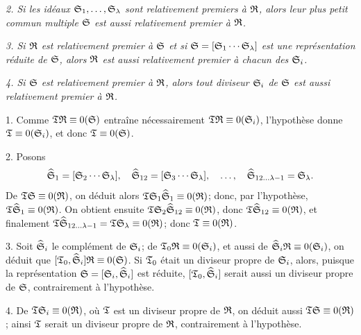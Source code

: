 \emph{2. Si les idéaux $\mathfrak{S}_1,\ldots,\mathfrak{S}_\lambda$ sont relativement premiers à $\mathfrak{R}$, alors leur plus petit commun multiple $\mathfrak{S}$ est aussi relativement premier à $\mathfrak{R}$.}

\emph{3. Si $\mathfrak{R}$ est relativement premier à $\mathfrak{S}$ et si $\mathfrak{S}=[\mathfrak{S}_1\cdots\mathfrak{S}_\lambda]$ est une représentation réduite de $\mathfrak{S}$, alors $\mathfrak{R}$ est aussi relativement premier à chacun des $\mathfrak{S}_i$.}

\emph{4. Si $\mathfrak{S}$ est relativement premier à $\mathfrak{R}$, alors tout diviseur $\mathfrak{S}_i$ de $\mathfrak{S}$ est aussi relativement premier à $\mathfrak{R}$.}

1. Comme $\mathfrak{T}\mathfrak{R}\equiv0(\mathfrak{S})$ entraîne nécessairement $\mathfrak{T}\mathfrak{R}\equiv0(\mathfrak{S}_i)$, l'hypothèse donne $\mathfrak{T}\equiv0(\mathfrak{S}_i)$, et donc $\mathfrak{T}\equiv0(\mathfrak{S})$.

2. Posons
\[
 \widehat{\mathfrak{S}}_1=[\mathfrak{S}_2\cdots\mathfrak{S}_\lambda],\quad
 \widehat{\mathfrak{S}}_{12}=[\mathfrak{S}_3\cdots\mathfrak{S}_\lambda],\quad \ldots,\quad
 \widehat{\mathfrak{S}}_{12\ldots\lambda-1}=\mathfrak{S}_\lambda.
\]
De $\mathfrak{T}\mathfrak{S}\equiv0(\mathfrak{R})$, on déduit alors $\mathfrak{T}\mathfrak{S}_1\widehat{\mathfrak{S}}_1\equiv0(\mathfrak{R})$; donc, par l'hypothèse, $\mathfrak{T}\widehat{\mathfrak{S}}_1\equiv0(\mathfrak{R})$. On obtient ensuite $\mathfrak{T}\mathfrak{S}_2\widehat{\mathfrak{S}}_{12}\equiv0(\mathfrak{R})$, donc $\mathfrak{T}\widehat{\mathfrak{S}}_{12}\equiv0(\mathfrak{R})$, et finalement $\mathfrak{T}\widehat{\mathfrak{S}}_{12\ldots\lambda-1}=\mathfrak{T}\mathfrak{S}_\lambda\equiv0(\mathfrak{R})$; donc $\mathfrak{T}\equiv0(\mathfrak{R})$.

3. Soit $\widehat{\mathfrak{S}}_i$ le complément de $\mathfrak{S}_i$; de $\mathfrak{T}_0\mathfrak{R}\equiv0(\mathfrak{S}_i)$, et aussi de $\widehat{\mathfrak{S}}_i\mathfrak{R}\equiv0(\mathfrak{S}_i)$, on déduit que $[\mathfrak{T}_0,\widehat{\mathfrak{S}}_i]\mathfrak{R}\equiv0(\mathfrak{S})$. Si $\mathfrak{T}_0$ était un diviseur propre de $\mathfrak{S}_i$, alors, puisque la représentation $\mathfrak{S}=[\mathfrak{S}_i,\widehat{\mathfrak{S}}_i]$ est réduite, $[\mathfrak{T}_0,\widehat{\mathfrak{S}}_i]$ serait aussi un diviseur propre de $\mathfrak{S}$, contrairement à l'hypothèse.

4. De $\mathfrak{T}\mathfrak{S}_i\equiv0(\mathfrak{R})$, où $\mathfrak{T}$ est un diviseur propre de $\mathfrak{R}$, on déduit aussi $\mathfrak{T}\mathfrak{S}\equiv0(\mathfrak{R})$; ainsi $\mathfrak{T}$ serait un diviseur propre de $\mathfrak{R}$, contrairement à l'hypothèse.

